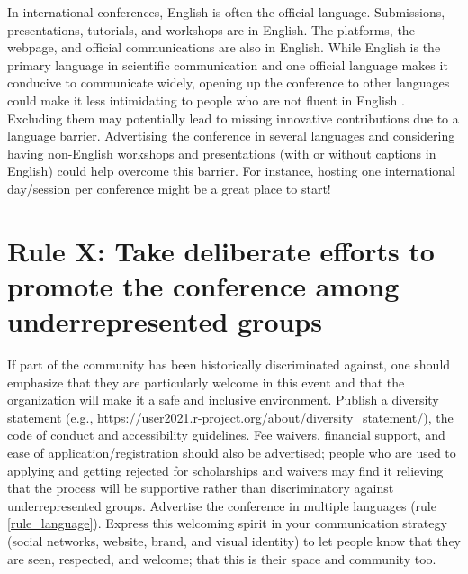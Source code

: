 \documentclass[10pt,letterpaper]{article}
\begin{document}
In international conferences, English is often the official language. Submissions, presentations, tutorials, and workshops are in English. The platforms, the webpage, and official communications are also in English. While English is the primary language in scientific communication and one official language makes it conducive to communicate widely, opening up the conference to other languages could make it less intimidating to people who are not fluent in English \cite{niner_better_2021}. Excluding them may potentially lead to missing innovative contributions due to a language barrier. Advertising the conference in several languages and considering having non-English workshops and presentations (with or without captions in English) could help overcome this barrier. For instance, hosting one international day/session per conference might be a great place to start!


\section{Rule X: Take deliberate efforts to promote the conference among underrepresented groups}

If part of the community has been historically discriminated against, one should emphasize that they are particularly welcome in this event and that the organization will make it a safe and inclusive environment. Publish a diversity statement (e.g., \url{https://user2021.r-project.org/about/diversity_statement/}), the code of conduct and accessibility guidelines. Fee waivers, financial support, and ease of application/registration should also be advertised; people who are used to applying and getting rejected for scholarships and waivers may find it relieving that the process will be supportive rather than discriminatory against underrepresented groups. Advertise the conference in multiple languages (rule \ref{rule_language}). Express this welcoming spirit in your communication strategy (social networks, website, brand, and visual identity) to let people know that they are seen, respected, and welcome; that this is their space and community too. 

\end{document}
